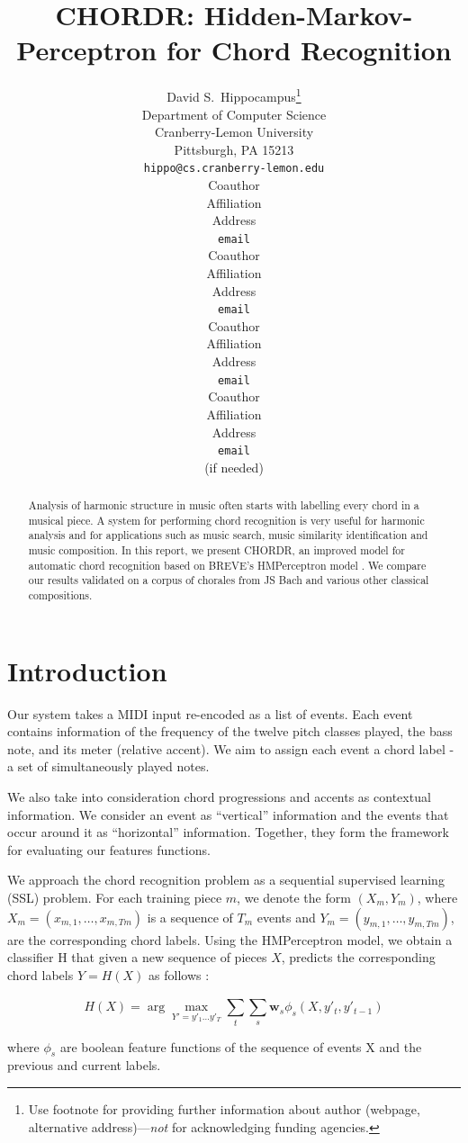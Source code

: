 \documentclass{article} %
\title{CHORDR: Hidden-Markov-Perceptron for Chord Recognition}
\author{
David S.~Hippocampus\thanks{ Use footnote for providing further information
about author (webpage, alternative address)---\emph{not} for acknowledging
funding agencies.} \\
Department of Computer Science\\
Cranberry-Lemon University\\
Pittsburgh, PA 15213 \\
\texttt{hippo@cs.cranberry-lemon.edu} \\
\And
Coauthor \\
Affiliation \\
Address \\
\texttt{email} \\
\AND
Coauthor \\
Affiliation \\
Address \\
\texttt{email} \\
\And
Coauthor \\
Affiliation \\
Address \\
\texttt{email} \\
\And
Coauthor \\
Affiliation \\
Address \\
\texttt{email} \\
(if needed)\\
}
\begin{document}
\maketitle

\begin{abstract}
Analysis of harmonic structure in music often starts with labelling every chord in a musical piece. A system for performing chord recognition is very useful for harmonic analysis and for applications such as music search, music similarity identification and music composition. In this report, we present CHORDR, an improved model for automatic chord recognition based on BREVE’s HMPerceptron model \cite{breve}. We compare our results validated on a corpus of chorales from JS Bach and various other classical compositions.
\end{abstract}

\section{Introduction}

Our system takes a MIDI input re-encoded as a list of events. Each event contains information of the frequency of the twelve pitch classes played, the bass note, and its meter (relative accent). We aim to assign each event a chord label - a set of simultaneously played notes.

We also take into consideration chord progressions and accents as contextual information. We consider an event as “vertical” information and the events that occur around it as “horizontal” information. Together, they form the framework for evaluating our features functions.

We approach the chord recognition problem as a sequential supervised learning (SSL) problem. For each training piece $m$, we denote the form $(X_m, Y_m)$, where $X_m = (x_{m,1},\ldots,x_{m,Tm})$ is a sequence of $T_m$ events and $Y_m = (y_{m,1},\ldots,y_{m,Tm})$, are the corresponding chord labels. Using the HMPerceptron model, we obtain a classifier H that given a new sequence of pieces $X$, predicts the corresponding chord labels $Y=H(X)$ as follows \cite{breve}:

\begin{equation}
  H(X) = \arg\max_{Y'={y'_1\ldots y'_T}}\sum_t^{}\sum_s^{}\mathbf{w}_s\phi_s(X,y'_t,y'_{t-1})
\end{equation}

where $\phi_s$ are boolean feature functions of the sequence of events X and the previous and current labels.
\end{document}
